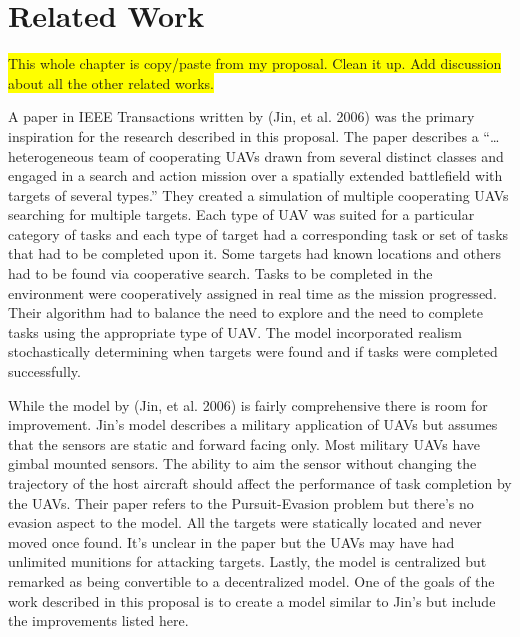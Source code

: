 \chapter{Related Work}

\colorbox{yellow}{This whole chapter is copy/paste from my proposal.  Clean it up.  Add discussion about all the other related works.}

A paper in IEEE Transactions written by (Jin, et al. 2006) was the primary inspiration for the research described in this proposal.  The paper describes a “… heterogeneous team of cooperating UAVs drawn from several distinct classes and engaged in a search and action mission over a spatially extended battlefield with targets of several types.” They created a simulation of multiple cooperating UAVs searching for multiple targets.  Each type of UAV was suited for a particular category of tasks and each type of target had a corresponding task or set of tasks that had to be completed upon it.  Some targets had known locations and others had to be found via cooperative search.  Tasks to be completed in the environment were cooperatively assigned in real time as the mission progressed.  Their algorithm had to balance the need to explore and the need to complete tasks using the appropriate type of UAV.  The model incorporated realism stochastically determining when targets were found and if tasks were completed successfully.

While the model by (Jin, et al. 2006) is fairly comprehensive there is room for improvement.  Jin’s model describes a military application of UAVs but assumes that the sensors are static and forward facing only.  Most military UAVs have gimbal mounted sensors.  The ability to aim the sensor without changing the trajectory of the host aircraft should affect the performance of task completion by the UAVs.  Their paper refers to the Pursuit-Evasion problem but there’s no evasion aspect to the model.  All the targets were statically located and never moved once found.  It’s unclear in the paper but the UAVs may have had unlimited munitions for attacking targets. Lastly, the model is centralized but remarked as being convertible to a decentralized model.  One of the goals of the work described in this proposal is to create a model similar to Jin’s but include the improvements listed here.

